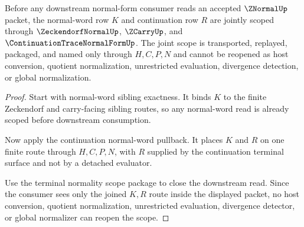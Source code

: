\begin{theorem}
\label{thm:znormal-normal-word-continuation-scope-lock}
Before any downstream normal-form consumer reads an accepted $\ZNormalUp$ packet, the normal-word row $K$ and continuation row $R$ are jointly scoped through $\ZeckendorfNormalUp$, $\ZCarryUp$, and $\ContinuationTraceNormalFormUp$. The joint scope is transported, replayed, packaged, and named only through $H,C,P,N$ and cannot be reopened as host conversion, quotient normalization, unrestricted evaluation, divergence detection, or global normalization.
\end{theorem}
\begin{proof}
Start with normal-word sibling exactness. It binds $K$ to the finite Zeckendorf and carry-facing sibling routes, so any normal-word read is already scoped before downstream consumption.

Now apply the continuation normal-word pullback. It places $K$ and $R$ on one finite route through $H,C,P,N$, with $R$ supplied by the continuation terminal surface and not by a detached evaluator.

Use the terminal normality scope package to close the downstream read. Since the consumer sees only the joined $K,R$ route inside the displayed packet, no host conversion, quotient normalization, unrestricted evaluation, divergence detector, or global normalizer can reopen the scope.
\end{proof}
